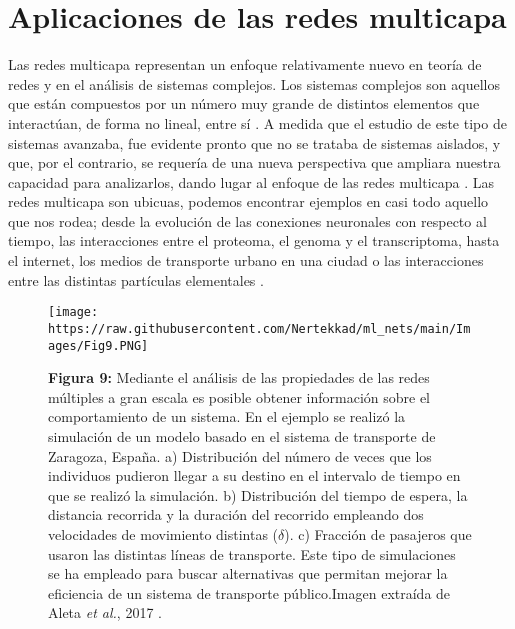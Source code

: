 \documentclass[
]{book}
\begin{document}
\hypertarget{aplicaciones-de-las-redes-multicapa}{%
\section*{Aplicaciones de las redes multicapa}\label{aplicaciones-de-las-redes-multicapa}}

Las redes multicapa representan un enfoque relativamente nuevo en teoría de redes y en el análisis de sistemas complejos. Los sistemas complejos son aquellos que están compuestos por un número muy grande de distintos elementos que interactúan, de forma no lineal, entre sí \citep{liu2016control}. A medida que el estudio de este tipo de sistemas avanzaba, fue evidente pronto que no se trataba de sistemas aislados, y que, por el contrario, se requería de una nueva perspectiva que ampliara nuestra capacidad para analizarlos, dando lugar al enfoque de las redes multicapa \citep{bianconi2018multilayer}. Las redes multicapa son ubicuas, podemos encontrar ejemplos en casi todo aquello que nos rodea; desde la evolución de las conexiones neuronales con respecto al tiempo, las interacciones entre el proteoma, el genoma y el transcriptoma, hasta el internet, los medios de transporte urbano en una ciudad o las interacciones entre las distintas partículas elementales \citep{bianconi2018multilayer}.

\begin{figure}
\centering
\texttt{[image: https://raw.githubusercontent.com/Nertekkad/ml\_nets/main/Images/Fig9.PNG]}
\caption{\textbf{Figura 9:} Mediante el análisis de las propiedades de las redes múltiples a gran escala es posible obtener información sobre el comportamiento de un sistema. En el ejemplo se realizó la simulación de un modelo basado en el sistema de transporte de Zaragoza, España. a) Distribución del número de veces que los individuos pudieron llegar a su destino en el intervalo de tiempo en que se realizó la simulación. b) Distribución del tiempo de espera, la distancia recorrida y la duración del recorrido empleando dos velocidades de movimiento distintas (\(\delta\)). c) Fracción de pasajeros que usaron las distintas líneas de transporte. Este tipo de simulaciones se ha empleado para buscar alternativas que permitan mejorar la eficiencia de un sistema de transporte público.Imagen extraída de Aleta \emph{et al.}, 2017 \citep{aleta2017multilayer}.}
\end{figure}
\end{document}
